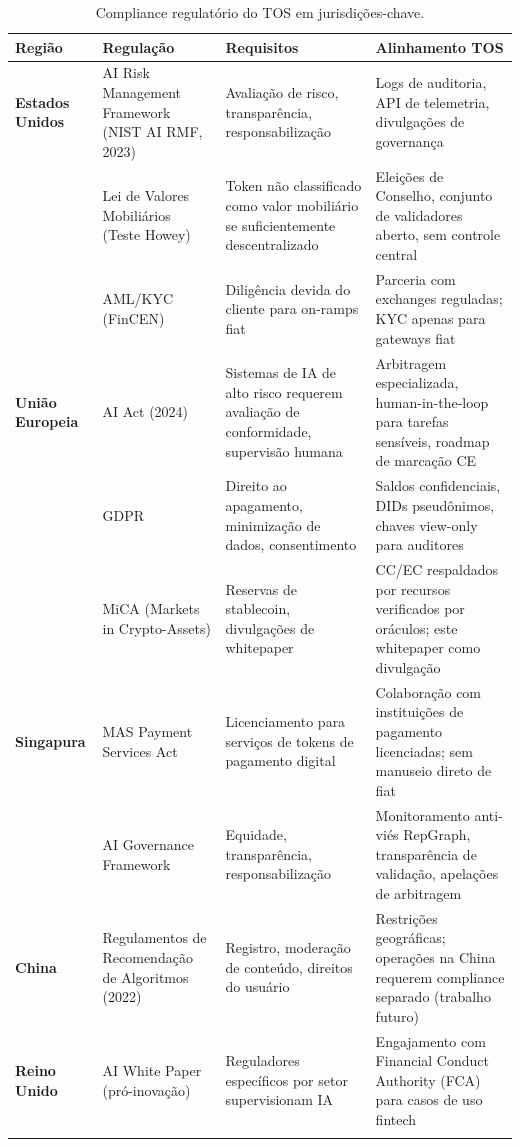 \documentclass[11pt]{article}
\begin{document}
\begin{itemize}[noitemsep]
\begin{itemize}[noitemsep]
\begin{itemize}[noitemsep]
\begin{longtable}{@{}p{}p{}p{}p{}@{}}
\toprule
\textbf{Região} & \textbf{Regulação} & \textbf{Requisitos} & \textbf{Alinhamento TOS} \\\midrule
\textbf{Estados Unidos} & AI Risk Management Framework (NIST AI RMF, 2023) & Avaliação de risco, transparência, responsabilização & Logs de auditoria, API de telemetria, divulgações de governança \\
 & Lei de Valores Mobiliários (Teste Howey) & Token não classificado como valor mobiliário se suficientemente descentralizado & Eleições de Conselho, conjunto de validadores aberto, sem controle central \\
 & AML/KYC (FinCEN) & Diligência devida do cliente para on-ramps fiat & Parceria com exchanges reguladas; KYC apenas para gateways fiat \\
\textbf{União Europeia} & AI Act (2024) & Sistemas de IA de alto risco requerem avaliação de conformidade, supervisão humana & Arbitragem especializada, human-in-the-loop para tarefas sensíveis, roadmap de marcação CE \\
 & GDPR & Direito ao apagamento, minimização de dados, consentimento & Saldos confidenciais, DIDs pseudônimos, chaves view-only para auditores \\
 & MiCA (Markets in Crypto-Assets) & Reservas de stablecoin, divulgações de whitepaper & CC/EC respaldados por recursos verificados por oráculos; este whitepaper como divulgação \\
\textbf{Singapura} & MAS Payment Services Act & Licenciamento para serviços de tokens de pagamento digital & Colaboração com instituições de pagamento licenciadas; sem manuseio direto de fiat \\
 & AI Governance Framework & Equidade, transparência, responsabilização & Monitoramento anti-viés RepGraph, transparência de validação, apelações de arbitragem \\
\textbf{China} & Regulamentos de Recomendação de Algoritmos (2022) & Registro, moderação de conteúdo, direitos do usuário & Restrições geográficas; operações na China requerem compliance separado (trabalho futuro) \\
\textbf{Reino Unido} & AI White Paper (pró-inovação) & Reguladores específicos por setor supervisionam IA & Engajamento com Financial Conduct Authority (FCA) para casos de uso fintech \\
\bottomrule
\caption{Compliance regulatório do TOS em jurisdições-chave.}
\end{longtable}


\end{itemize}
\end{itemize}
\end{itemize}
\end{document}
